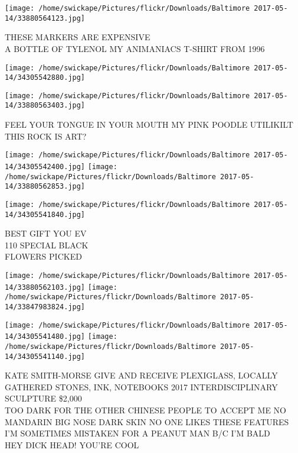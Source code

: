 \documentclass[10pt,letterpaper]{article}
\begin{document}
\vspace{0.25in}
\texttt{[image: /home/swickape/Pictures/flickr/Downloads/Baltimore 2017-05-14/33880564123.jpg]}

THESE MARKERS ARE EXPENSIVE\\
A BOTTLE OF TYLENOL MY ANIMANIACS T{-}SHIRT FROM 1996
\pagebreak

\texttt{[image: /home/swickape/Pictures/flickr/Downloads/Baltimore 2017-05-14/34305542880.jpg]}

\vspace{0.25in}
\texttt{[image: /home/swickape/Pictures/flickr/Downloads/Baltimore 2017-05-14/33880563403.jpg]}

FEEL YOUR TONGUE IN YOUR MOUTH MY PINK POODLE UTILIKILT\\
THIS ROCK IS ART?
\pagebreak

\texttt{[image: /home/swickape/Pictures/flickr/Downloads/Baltimore 2017-05-14/34305542400.jpg]}
\texttt{[image: /home/swickape/Pictures/flickr/Downloads/Baltimore 2017-05-14/33880562853.jpg]}

\vspace{0.25in}
\texttt{[image: /home/swickape/Pictures/flickr/Downloads/Baltimore 2017-05-14/34305541840.jpg]}

BEST GIFT YOU EV\\
110 SPECIAL BLACK\\
FLOWERS PICKED
\pagebreak

\texttt{[image: /home/swickape/Pictures/flickr/Downloads/Baltimore 2017-05-14/33880562103.jpg]}
\texttt{[image: /home/swickape/Pictures/flickr/Downloads/Baltimore 2017-05-14/33847983824.jpg]}

\texttt{[image: /home/swickape/Pictures/flickr/Downloads/Baltimore 2017-05-14/34305541480.jpg]}
\texttt{[image: /home/swickape/Pictures/flickr/Downloads/Baltimore 2017-05-14/34305541140.jpg]}

KATE SMITH{-}MORSE GIVE AND RECEIVE PLEXIGLASS, LOCALLY GATHERED STONES, INK, NOTEBOOKS 2017 INTERDISCIPLINARY SCULPTURE \$2,000\\
TOO DARK FOR THE OTHER CHINESE PEOPLE TO ACCEPT ME NO MANDARIN BIG NOSE DARK SKIN NO ONE LIKES THESE FEATURES\\
I'M SOMETIMES MISTAKEN FOR A PEANUT MAN B/C I'M BALD\\
HEY DICK HEAD!  YOU'RE COOL
\pagebreak
\end{document}
